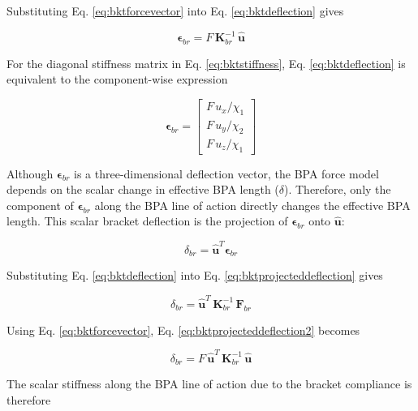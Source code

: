 Substituting Eq. \ref{eq:bktforcevector} into Eq. \ref{eq:bktdeflection} gives

\begin{equation}
\boldsymbol{\epsilon}_{br} = F \,\mathbf{K}_{br}^{-1} \,\hat{\mathbf{u}}
\label{eq:bktdeflectionforceunit}
\end{equation}

For the diagonal stiffness matrix in Eq. \ref{eq:bktstiffness}, Eq. \ref{eq:bktdeflection} is equivalent to the component-wise expression

\begin{equation}
\boldsymbol{\epsilon}_{br} = \begin{bmatrix} F\,u_{x}/\chi_{1} \\ F\,u_{y}/\chi_{2} \\ F\,u_{z}/\chi_{1} \end{bmatrix}
\label{eq:bktcomponentdeflection}
\end{equation}

Although $\boldsymbol{\epsilon}_{br}$ is a three-dimensional deflection vector, the BPA force model depends on the scalar change in effective BPA length ($\delta$). Therefore, only the component of $\boldsymbol{\epsilon}_{br}$ along the BPA line of action directly changes the effective BPA length. This scalar bracket deflection is the projection of $\boldsymbol{\epsilon}_{br}$ onto $\hat{\mathbf{u}}$:

\begin{equation}
{\delta}_{br} = \hat{\mathbf{u}}^{T} \boldsymbol{\epsilon}_{br}
\label{eq:bktprojecteddeflection}
\end{equation}

Substituting Eq. \ref{eq:bktdeflection} into Eq. \ref{eq:bktprojecteddeflection} gives

\begin{equation}
{\delta}_{br} = \hat{\mathbf{u}}^{T} \, \mathbf{K}_{br}^{-1} \, \mathbf{F}_{br}
\label{eq:bktprojecteddeflection2}
\end{equation}

Using Eq. \ref{eq:bktforcevector}, Eq. \ref{eq:bktprojecteddeflection2} becomes

\begin{equation}
\delta_{br} = F\, \hat{\mathbf{u}}^{T} \, \mathbf{K}_{br}^{-1} \, \hat{\mathbf{u}}
\label{eq:bktprojectedcompliance}
\end{equation}

The scalar stiffness along the BPA line of action due to the bracket compliance is therefore

